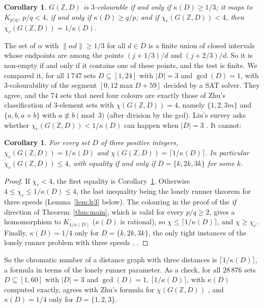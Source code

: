 \documentclass[11pt,a4paper]{amsart}
\newtheorem{corollary}[theorem]{Corollary}
\theoremstyle{definition}
\newcommand{\Z}{\mathbb{Z}}
\begin{document}
\begin{corollary}\label{cor:dist}
$G(\Z,D)$ is $3$-colourable if and only if $\kappa(D)\ge1/3$; it maps to $K_{p/q}$, $p/q<4$, if and only if
$\kappa(D)\ge q/p$; and if $\chi_c(G(\Z,D))<4$, then $\chi_c(G(\Z,D))=1/\kappa(D)$.
\end{corollary}

The set of $\alpha$ with $\|\alpha d\|\ge1/3$ for all $d\in D$ is a finite union of closed intervals whose
endpoints are among the points $(j+1/3)/d$ and $(j+2/3)/d$. So it is non-empty if and only if it contains one of
these points, and the test is finite. We compared it, for all $1\,747$ sets $D\subseteq[1,24]$ with $|D|=3$ and
$\gcd(D)=1$, with $3$-colourability of the segment $[0,12\max D+59]$ decided by a SAT solver. They agree, and the
$74$ sets that need four colours are exactly those of Zhu's classification \cite{Zhu2002} of $3$-element sets with
$\chi(G(\Z,D))=4$, namely $\{1,2,3m\}$ and $\{a,b,a+b\}$ with $a\not\equiv b\pmod3$ (after division by the gcd).
Liu's survey asks whether $\chi_c(G(\Z,D))<1/\kappa(D)$ can happen when $|D|=3$ \cite[Problem~3]{Liu}. It
cannot:

\begin{corollary}\label{cor:liu}
For every set $D$ of three positive integers, $\chi_c(G(\Z,D))=1/\kappa(D)$ and
$\chi(G(\Z,D))=\lceil1/\kappa(D)\rceil$. In particular $\chi_c(G(\Z,D))\le4$, with equality if and only if
$D=\{k,2k,3k\}$ for some $k$.
\end{corollary}

\begin{proof}
If $\chi_c<4$, the first equality is Corollary~\ref{cor:dist}. Otherwise $4\le\chi_c\le1/\kappa(D)\le4$, the last
inequality being the lonely runner theorem for three speeds \cite{BW,Cusick} (Lemma~\ref{lem:lr3} below). The
colouring in the proof of the \emph{if} direction of Theorem~\ref{thm:main}, which is valid for every $p/q\ge2$,
gives a homomorphism to $K_{1/\kappa(D)}$ ($\kappa(D)$ is rational), so $\chi\le\lceil1/\kappa(D)\rceil$, and
$\chi\ge\chi_c$. Finally, $\kappa(D)=1/4$ only for $D=\{k,2k,3k\}$, the only tight instances of the lonely runner
problem with three speeds \cite{Cusick2}, \cite[\S\S4 and~6.2]{PS}.
\end{proof}

So the chromatic number of a distance graph with three distances is $\lceil1/\kappa(D)\rceil$, a formula in terms of
the lonely runner parameter. As a check, for all $28\,876$ sets $D\subseteq[1,60]$ with $|D|=3$ and $\gcd(D)=1$,
$\lceil1/\kappa(D)\rceil$, with $\kappa(D)$ computed exactly, agrees with Zhu's formula for $\chi(G(\Z,D))$
\cite{Zhu2002}, and $\kappa(D)=1/4$ only for $D=\{1,2,3\}$.
\end{document}
